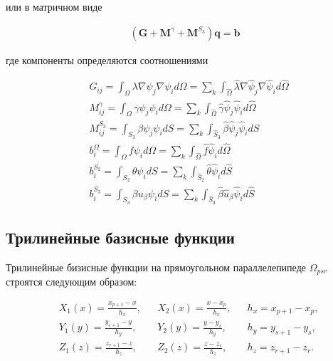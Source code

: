 \documentclass[12pt]{article}
\begin{document}
\vskip 5mm
\noindent или в матричном виде

\begin{align}
  (\textbf{G} + \textbf{M}^{\gamma} + \textbf{M}^{S_3})\textbf{q} = \textbf{b}
\end{align}

\vskip 5mm
\noindent где компоненты определяются соотношениями

\begin{align}
  &G_{ij} = \int_{\Omega}\lambda \nabla \psi_j \nabla \psi_i d\Omega
          = \sum_{k}\int_{\hat{\Omega}}\hat{\lambda}\nabla\hat{\psi}_j\nabla\hat{\psi}_i d\hat{\Omega} \\
  &M^{\gamma}_{ij} = \int_{\Omega}\gamma \psi_j \psi_i d\Omega
                   = \sum_{k}\int_{\hat{\Omega}}\hat{\gamma}\hat{\psi}_j\hat{\psi}_i d\hat{\Omega}\\
  &M^{S_3}_{ij} = \int_{S_3}\beta \psi_j \psi_i dS
                = \sum_{k}\int_{\hat{S}_3}\hat{\beta}\hat{\psi}_j\hat{\psi}_i d\hat{S} \\
  &b^{\Omega}_{i} = \int_{\Omega}f \psi_i d\Omega
                  = \sum_{k}\int_{\hat{\Omega}}\hat{f}\hat{\psi}_i d\hat{\Omega} \\
  &b^{S_2}_{i} = \int_{S_2}\theta \psi_i dS
               = \sum_{k}\int_{\hat{S}_2}\hat{\theta}\hat{\psi}_i d\hat{S} \\
  &b^{S_3}_{i} = \int_{S_3}\beta u_{\beta} \psi_i dS
               = \sum_{k}\int_{\hat{S}_3}\hat{\beta}\hat{u}_{\beta}\hat{\psi}_i d\hat{S}
\end{align}

\vskip 5mm

\subsection{Трилинейные базисные функции}

\vskip 5mm
\noindent Трилинейные бизисные функции на прямоугольном параллелепипеде $\Omega_{psr}$ строятся
  следующим образом:

\begin{align*}
  & X_1(x) = \frac{x_{p+1}-x}{h_x}, & &X_2(x) = \frac{x - x_{p}}{h_x}, & &h_x = x_{p+1} - x_p, \\
  & Y_1(y) = \frac{y_{s+1}-y}{h_y}, & &Y_2(y) = \frac{y - y_{s}}{h_y}, & &h_y = y_{s+1} - y_s, \\
  & Z_1(z) = \frac{z_{r+1}-z}{h_z}, & &Z_2(z) = \frac{z - z_{r}}{h_z}, & &h_z = z_{r+1} - z_r.
\end{align*}
\end{document}
